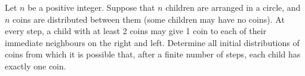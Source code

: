 Let $n$ be a positive integer. Suppose that $n$ children are arranged in a circle, and $n$ coins are distributed between them (some children may have no coins). At every step, a child with at least 2 coins may give 1 coin to each of their immediate neighbours on the right and left. Determine all initial distributions of coins from which it is possible that, after a finite number of steps, each child has exactly one coin.

